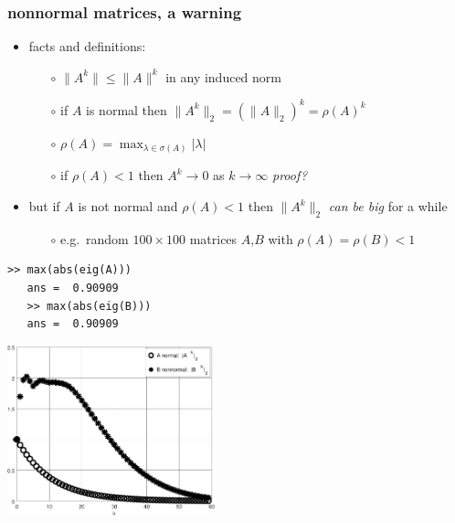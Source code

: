 \documentclass[10pt,hyperref]{beamer}
\begin{document}
\begin{frame}[fragile]
\frametitle{nonnormal matrices, a warning}

\begin{itemize}
\item facts and definitions:
    \begin{itemize}
    \item[$\circ$] $\|A^k\|\le \|A\|^k$ in any induced norm
    \item[$\circ$] if $A$ is normal then $\|A^k\|_2 = (\|A\|_2)^k = \rho(A)^k$
    \item[$\circ$] $\rho(A) = \max_{\lambda\in\sigma(A)} |\lambda|$
    \item[$\circ$] if $\rho(A)<1$ then $A^k \to 0$ as $k\to \infty$ \hfill \emph{proof?}
    \end{itemize}
\item but if $A$ is not normal and $\rho(A)<1$ then $\|A^k\|_2$ \emph{can be big} for a while
    \begin{itemize}
    \item[$\circ$] e.g.~random $100\times 100$ matrices $A$,$B$ with $\rho(A)=\rho(B)<1$
    \end{itemize}
\end{itemize}

\bigskip
\begin{Verbatim}[fontsize=\footnotesize]
   >> max(abs(eig(A)))
   ans =  0.90909
   >> max(abs(eig(B)))
   ans =  0.90909
\end{Verbatim}

\vspace{-17mm}
\hfill \includegraphics[width=0.45\textwidth]{figs/normpowers} \quad \phantom{foo}
\end{frame}
\end{document}

